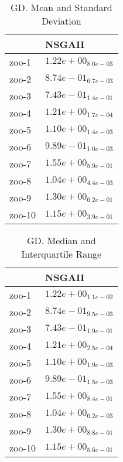 \documentclass{article}
\begin{document}
\begin{table}
\caption{GD. Mean and Standard Deviation}
\label{table: GD}
\centering
\begin{scriptsize}
\begin{tabular}{ll}
\hline &  NSGAII\\
\hline 
zoo-1 & \cellcolor{gray95}$  1.22e+00_{ 8.0e-03}$ \\
zoo-2 & \cellcolor{gray95}$  8.74e-01_{ 6.7e-03}$ \\
zoo-3 & \cellcolor{gray95}$  7.43e-01_{ 1.4e-01}$ \\
zoo-4 & \cellcolor{gray95}$  1.21e+00_{ 1.7e-04}$ \\
zoo-5 & \cellcolor{gray95}$  1.10e+00_{ 1.4e-03}$ \\
zoo-6 & \cellcolor{gray95}$  9.89e-01_{ 1.0e-03}$ \\
zoo-7 & \cellcolor{gray95}$  1.55e+00_{ 5.9e-01}$ \\
zoo-8 & \cellcolor{gray95}$  1.04e+00_{ 4.4e-03}$ \\
zoo-9 & \cellcolor{gray95}$  1.30e+00_{ 6.2e-01}$ \\
zoo-10 & \cellcolor{gray95}$  1.15e+00_{ 3.9e-01}$ \\
\hline
\end{tabular}
\end{scriptsize}
\end{table}

\begin{table}
\caption{GD. Median and Interquartile Range}
\label{table: GD}
\centering
\begin{scriptsize}
\begin{tabular}{ll}
\hline &  NSGAII\\
\hline 
zoo-1 & \cellcolor{gray95}$  1.22e+00_{ 1.1e-02}$ \\
zoo-2 & \cellcolor{gray95}$  8.74e-01_{ 9.5e-03}$ \\
zoo-3 & \cellcolor{gray95}$  7.43e-01_{ 1.9e-01}$ \\
zoo-4 & \cellcolor{gray95}$  1.21e+00_{ 2.5e-04}$ \\
zoo-5 & \cellcolor{gray95}$  1.10e+00_{ 1.9e-03}$ \\
zoo-6 & \cellcolor{gray95}$  9.89e-01_{ 1.5e-03}$ \\
zoo-7 & \cellcolor{gray95}$  1.55e+00_{ 8.4e-01}$ \\
zoo-8 & \cellcolor{gray95}$  1.04e+00_{ 6.2e-03}$ \\
zoo-9 & \cellcolor{gray95}$  1.30e+00_{ 8.8e-01}$ \\
zoo-10 & \cellcolor{gray95}$  1.15e+00_{ 5.6e-01}$ \\
\hline
\end{tabular}
\end{scriptsize}
\end{table}
\end{document}
